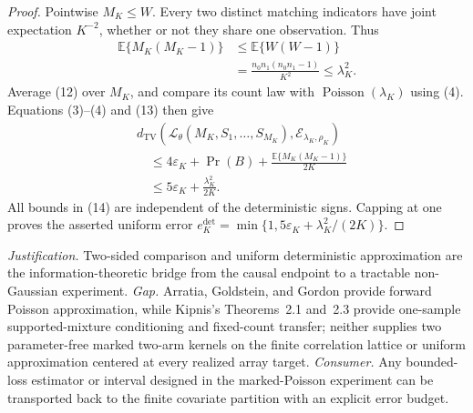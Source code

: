 \documentclass{article}
\begin{document}
\begin{proof}
Pointwise \(M_K\le W\).  Every two distinct matching indicators have
joint expectation \(K^{-2}\), whether or not they share one observation.
Thus
\[
\begin{aligned}
 \mathbb E\{M_K(M_K-1)\}
 &\le\mathbb E\{W(W-1)\}\\
 &=\frac{n_0n_1(n_0n_1-1)}{K^2}
 \le\lambda_K^2.
\end{aligned}
\tag{13}
\]
Average (12) over \(M_K\), and compare its count law with
\(\operatorname{Poisson}(\lambda_K)\) using (4).  Equations
(3)--(4) and (13) then give
\[
\begin{aligned}
 &d_{\mathrm{TV}}\!\left(
 \mathcal L_\theta(M_K,S_1,\ldots,S_{M_K}),
 \mathcal E_{\lambda_K,\rho_K}\right)\\
 &\quad\le
 4\varepsilon_K+\Pr(B)
 +\frac{\mathbb E\{M_K(M_K-1)\}}{2K}\\
 &\quad\le
 5\varepsilon_K+\frac{\lambda_K^2}{2K}.
\end{aligned}
\tag{14}
\]
All bounds in (14) are independent of the deterministic signs.  Capping
at one proves the asserted uniform error
\(e_K^{\mathrm{det}}=\min\{1,5\varepsilon_K+\lambda_K^2/(2K)\}\).
\end{proof}
\par\smallskip\noindent \textit{Justification.} Two-sided comparison and uniform deterministic approximation are the information-theoretic bridge from the causal endpoint to a tractable non-Gaussian experiment. \textit{Gap.} Arratia, Goldstein, and Gordon provide forward Poisson approximation, while Kipnis's Theorems~2.1 and~2.3 provide one-sample supported-mixture conditioning and fixed-count transfer; neither supplies two parameter-free marked two-arm kernels on the finite correlation lattice or uniform approximation centered at every realized array target. \textit{Consumer.} Any bounded-loss estimator or interval designed in the marked-Poisson experiment can be transported back to the finite covariate partition with an explicit error budget.
\end{document}
